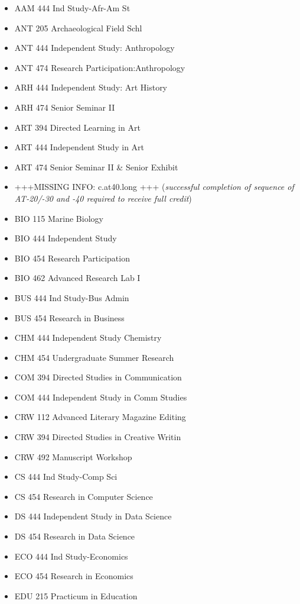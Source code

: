 \documentclass[
  letterpaper,
]{scrbook}
\providecommand{\tightlist}{%
  \setlength{\itemsep}{0pt}\setlength{\parskip}{0pt}}
\begin{document}
\begin{itemize}
\tightlist
\item
  AAM 444 Ind Study-Afr-Am St
\item
  ANT 205 Archaeological Field Schl
\item
  ANT 444 Independent Study: Anthropology
\item
  ANT 474 Research Participation:Anthropology
\item
  ARH 444 Independent Study: Art History
\item
  ARH 474 Senior Seminar II
\item
  ART 394 Directed Learning in Art
\item
  ART 444 Independent Study in Art
\item
  ART 474 Senior Seminar II \& Senior Exhibit
\item
  +++MISSING INFO: c.at40.long +++ (\emph{successful completion of
  sequence of AT-20/-30 and -40 required to receive full credit})
\item
  BIO 115 Marine Biology
\item
  BIO 444 Independent Study
\item
  BIO 454 Research Participation
\item
  BIO 462 Advanced Research Lab I
\item
  BUS 444 Ind Study-Bus Admin
\item
  BUS 454 Research in Business
\item
  CHM 444 Independent Study Chemistry
\item
  CHM 454 Undergraduate Summer Research
\item
  COM 394 Directed Studies in Communication
\item
  COM 444 Independent Study in Comm Studies
\item
  CRW 112 Advanced Literary Magazine Editing
\item
  CRW 394 Directed Studies in Creative Writin
\item
  CRW 492 Manuscript Workshop
\item
  CS 444 Ind Study-Comp Sci
\item
  CS 454 Research in Computer Science
\item
  DS 444 Independent Study in Data Science
\item
  DS 454 Research in Data Science
\item
  ECO 444 Ind Study-Economics
\item
  ECO 454 Research in Economics
\item
  EDU 215 Practicum in Education

\end{itemize}
\end{document}
